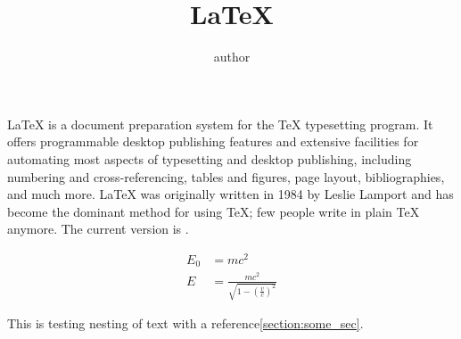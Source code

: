 \documentclass{article} %
\title{\LaTeX} %
\author{author}
\begin{document}
  \maketitle
  \LaTeX{} is a document preparation system for
  the \TeX{} typesetting program. It offers
  programmable desktop publishing features and
  extensive facilities for automating most
  aspects of typesetting and desktop publishing,
  including numbering and  cross-referencing,
  tables and figures, page layout,
  bibliographies, and much more. \LaTeX{} was
  originally written in 1984 by Leslie Lamport
  and has become the  dominant method for using
  \TeX; few people write in plain \TeX{} anymore.
  The current version is \LaTeXe.

  \begin{align}
    E_0 &= mc^2 \\
    E &= \frac{mc^2}{\sqrt{1-\left(\frac{v}{c}\right)^2}}\label{E}
  \end{align}

  This is testing {nesting {of {text} with a reference\ref{section:some_sec}}}.
\end{document}
